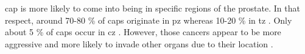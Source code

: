 \ac{cap} is more likely to come into being in specific regions of the prostate.
In that respect, around 70-80 \% of \acp{cap} originate in \ac{pz} whereas 10-20 \% in \ac{tz} \cite{Carrol1987,McNeal1988,Stamey1998}.
Only about 5 \% of \acp{cap} occur in \ac{cz} \cite{McNeal1988,Cohen2008}.
However, those cancers appear to be more aggressive and more likely to invade other organs due to their location \cite{Cohen2008}.









